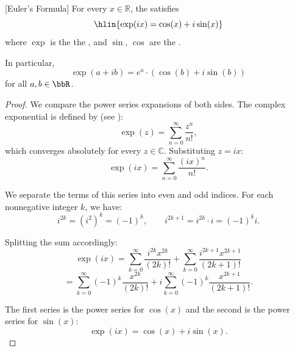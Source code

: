 \begin{theorem} \label{theorem:eulers_formula_for_complex_exponential_function}
[Euler's Formula] For every $x \in \mathbb{R}$, the  satisfies
$$\hlin{\exp(ix) = \cos(x) + i\sin(x)}$$
where $\exp$ is the  the , and $\sin$, $\cos$ are the .

In particular, 
$$\exp(a+ib) = e^a \cdot (\cos(b) + i\sin(b))$$
for all $a,b \in \bbR$.
\end{theorem}
\begin{proof}
    We compare the power series expansions of both sides. The complex exponential is defined by (see ):
    $$\exp(z) = \sum_{n=0}^\infty \frac{z^n}{n!},$$
    which converges absolutely for every $z \in \mathbb{C}$. Substituting $z = ix$:
    $$\exp(ix) = \sum_{n=0}^\infty \frac{(ix)^n}{n!}.$$

    We separate the terms of this series into even and odd indices. For each nonnegative integer $k$, we have:
    $$i^{2k} = (i^2)^k = (-1)^k, \qquad i^{2k+1} = i^{2k} \cdot i = (-1)^k i.$$

    Splitting the sum accordingly:
    $$\exp(ix) = \sum_{k=0}^\infty \frac{i^{2k} x^{2k}}{(2k)!} + \sum_{k=0}^\infty \frac{i^{2k+1} x^{2k+1}}{(2k+1)!}$$
    $$= \sum_{k=0}^\infty (-1)^k \frac{x^{2k}}{(2k)!} + i \sum_{k=0}^\infty (-1)^k \frac{x^{2k+1}}{(2k+1)!}.$$

    The first series is the power series for $\cos(x)$ and the second is the power series for $\sin(x)$:
    $$\exp(ix) = \cos(x) + i\sin(x).$$
\end{proof}
